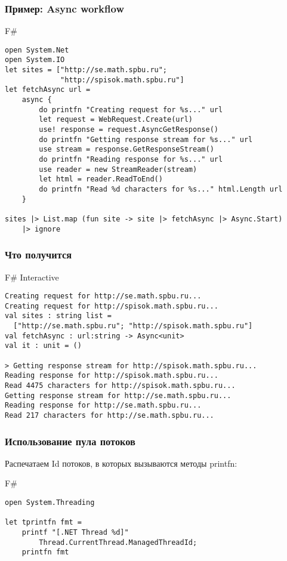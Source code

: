 \documentclass[xetex,mathserif,serif]{beamer}
\begin{document}
    \begin{frame}[fragile]
        \frametitle{Пример: Async workflow}
   		\begin{exampleblock}{F\#}
   			\begin{lstlisting}[basicstyle=\scriptsize]
open System.Net
open System.IO
let sites = ["http://se.math.spbu.ru";
             "http://spisok.math.spbu.ru"]
let fetchAsync url =
    async { 
        do printfn "Creating request for %s..." url
        let request = WebRequest.Create(url)
        use! response = request.AsyncGetResponse()
        do printfn "Getting response stream for %s..." url
        use stream = response.GetResponseStream()
        do printfn "Reading response for %s..." url
        use reader = new StreamReader(stream)
        let html = reader.ReadToEnd()
        do printfn "Read %d characters for %s..." html.Length url 
    }

sites |> List.map (fun site -> site |> fetchAsync |> Async.Start) 
    |> ignore
\end{lstlisting}
\end{exampleblock}
\end{frame}

    \begin{frame}[fragile]
        \frametitle{Что получится}
		\begin{alertblock}{F\# Interactive}
			\begin{lstlisting}[basicstyle=\scriptsize,keywordstyle=\color{black},emphstyle=\color{black}]
Creating request for http://se.math.spbu.ru...
Creating request for http://spisok.math.spbu.ru...
val sites : string list =
  ["http://se.math.spbu.ru"; "http://spisok.math.spbu.ru"]
val fetchAsync : url:string -> Async<unit>
val it : unit = ()

> Getting response stream for http://spisok.math.spbu.ru...
Reading response for http://spisok.math.spbu.ru...
Read 4475 characters for http://spisok.math.spbu.ru...
Getting response stream for http://se.math.spbu.ru...
Reading response for http://se.math.spbu.ru...
Read 217 characters for http://se.math.spbu.ru...
\end{lstlisting}
\end{alertblock}
\end{frame}

    \begin{frame}[fragile]
        \frametitle{Использование пула потоков}
        Распечатаем Id потоков, в которых вызываются методы printfn:
        \begin{exampleblock}{F\#}
    		\begin{lstlisting}
open System.Threading

let tprintfn fmt =
    printf "[.NET Thread %d]"   
        Thread.CurrentThread.ManagedThreadId;
    printfn fmt
\end{lstlisting}
\end{exampleblock}
\end{frame}
    
\end{document}
